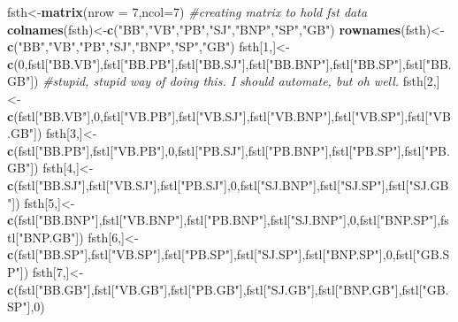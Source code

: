 \documentclass[]{article}
\newenvironment{Shaded}{\begin{snugshade}}{\end{snugshade}}
\newcommand{\KeywordTok}[1]{\textcolor[rgb]{0.13,0.29,0.53}{\textbf{#1}}}
\newcommand{\DataTypeTok}[1]{\textcolor[rgb]{0.13,0.29,0.53}{#1}}
\newcommand{\DecValTok}[1]{\textcolor[rgb]{0.00,0.00,0.81}{#1}}
\newcommand{\StringTok}[1]{\textcolor[rgb]{0.31,0.60,0.02}{#1}}
\newcommand{\CommentTok}[1]{\textcolor[rgb]{0.56,0.35,0.01}{\textit{#1}}}
\newcommand{\NormalTok}[1]{#1}
\begin{document}
\begin{Shaded}
\begin{Highlighting}[]
\NormalTok{fsth<-}\KeywordTok{matrix}\NormalTok{(}\DataTypeTok{nrow =} \DecValTok{7}\NormalTok{,}\DataTypeTok{ncol=}\DecValTok{7}\NormalTok{) }\CommentTok{#creating matrix to hold fst data}
\KeywordTok{colnames}\NormalTok{(fsth)<-}\KeywordTok{c}\NormalTok{(}\StringTok{"BB"}\NormalTok{,}\StringTok{"VB"}\NormalTok{,}\StringTok{"PB"}\NormalTok{,}\StringTok{"SJ"}\NormalTok{,}\StringTok{"BNP"}\NormalTok{,}\StringTok{"SP"}\NormalTok{,}\StringTok{"GB"}\NormalTok{)}
\KeywordTok{rownames}\NormalTok{(fsth)<-}\KeywordTok{c}\NormalTok{(}\StringTok{"BB"}\NormalTok{,}\StringTok{"VB"}\NormalTok{,}\StringTok{"PB"}\NormalTok{,}\StringTok{"SJ"}\NormalTok{,}\StringTok{"BNP"}\NormalTok{,}\StringTok{"SP"}\NormalTok{,}\StringTok{"GB"}\NormalTok{)}
\NormalTok{fsth[}\DecValTok{1}\NormalTok{,]<-}\KeywordTok{c}\NormalTok{(}\DecValTok{0}\NormalTok{,fstl[}\StringTok{"BB.VB"}\NormalTok{],fstl[}\StringTok{"BB.PB"}\NormalTok{],fstl[}\StringTok{"BB.SJ"}\NormalTok{],fstl[}\StringTok{"BB.BNP"}\NormalTok{],fstl[}\StringTok{"BB.SP"}\NormalTok{],fstl[}\StringTok{"BB.GB"}\NormalTok{]) }\CommentTok{#stupid, stupid way of doing this. I should automate, but oh well.}
\NormalTok{fsth[}\DecValTok{2}\NormalTok{,]<-}\KeywordTok{c}\NormalTok{(fstl[}\StringTok{"BB.VB"}\NormalTok{],}\DecValTok{0}\NormalTok{,fstl[}\StringTok{"VB.PB"}\NormalTok{],fstl[}\StringTok{"VB.SJ"}\NormalTok{],fstl[}\StringTok{"VB.BNP"}\NormalTok{],fstl[}\StringTok{"VB.SP"}\NormalTok{],fstl[}\StringTok{"VB.GB"}\NormalTok{])}
\NormalTok{fsth[}\DecValTok{3}\NormalTok{,]<-}\KeywordTok{c}\NormalTok{(fstl[}\StringTok{"BB.PB"}\NormalTok{],fstl[}\StringTok{"VB.PB"}\NormalTok{],}\DecValTok{0}\NormalTok{,fstl[}\StringTok{"PB.SJ"}\NormalTok{],fstl[}\StringTok{"PB.BNP"}\NormalTok{],fstl[}\StringTok{"PB.SP"}\NormalTok{],fstl[}\StringTok{"PB.GB"}\NormalTok{])}
\NormalTok{fsth[}\DecValTok{4}\NormalTok{,]<-}\KeywordTok{c}\NormalTok{(fstl[}\StringTok{"BB.SJ"}\NormalTok{],fstl[}\StringTok{"VB.SJ"}\NormalTok{],fstl[}\StringTok{"PB.SJ"}\NormalTok{],}\DecValTok{0}\NormalTok{,fstl[}\StringTok{"SJ.BNP"}\NormalTok{],fstl[}\StringTok{"SJ.SP"}\NormalTok{],fstl[}\StringTok{"SJ.GB"}\NormalTok{])}
\NormalTok{fsth[}\DecValTok{5}\NormalTok{,]<-}\KeywordTok{c}\NormalTok{(fstl[}\StringTok{"BB.BNP"}\NormalTok{],fstl[}\StringTok{"VB.BNP"}\NormalTok{],fstl[}\StringTok{"PB.BNP"}\NormalTok{],fstl[}\StringTok{"SJ.BNP"}\NormalTok{],}\DecValTok{0}\NormalTok{,fstl[}\StringTok{"BNP.SP"}\NormalTok{],fstl[}\StringTok{"BNP.GB"}\NormalTok{])}
\NormalTok{fsth[}\DecValTok{6}\NormalTok{,]<-}\KeywordTok{c}\NormalTok{(fstl[}\StringTok{"BB.SP"}\NormalTok{],fstl[}\StringTok{"VB.SP"}\NormalTok{],fstl[}\StringTok{"PB.SP"}\NormalTok{],fstl[}\StringTok{"SJ.SP"}\NormalTok{],fstl[}\StringTok{"BNP.SP"}\NormalTok{],}\DecValTok{0}\NormalTok{,fstl[}\StringTok{"GB.SP"}\NormalTok{])}
\NormalTok{fsth[}\DecValTok{7}\NormalTok{,]<-}\KeywordTok{c}\NormalTok{(fstl[}\StringTok{"BB.GB"}\NormalTok{],fstl[}\StringTok{"VB.GB"}\NormalTok{],fstl[}\StringTok{"PB.GB"}\NormalTok{],fstl[}\StringTok{"SJ.GB"}\NormalTok{],fstl[}\StringTok{"BNP.GB"}\NormalTok{],fstl[}\StringTok{"GB.SP"}\NormalTok{],}\DecValTok{0}\NormalTok{)}



\end{Highlighting}
\end{Shaded}
\end{document}
